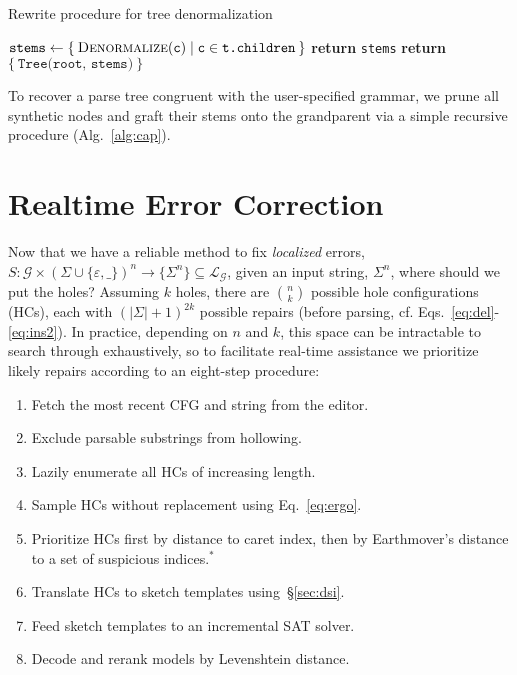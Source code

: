 \documentclass[sigplan,review,anonymous,acmsmall]{acmart}\settopmatter{printfolios=false,printccs=false,printacmref=false}
\begin{document}
    \begin{algorithm}
        \caption{Rewrite procedure for tree denormalization}\label{alg:cap}
        \begin{algorithmic}
                \State $\texttt{stems} \leftarrow \{\:\textsc{Denormalize}(\texttt{c}) \mid \texttt{c} \in \texttt{t.children}\:\}$
                    \State \textbf{return } \texttt{stems} 
                \Else{}
                \State \textbf{return } $\{\:\texttt{Tree(root, stems)}\:\}$
                \EndIf
            \EndProcedure
        \end{algorithmic}
    \end{algorithm}

    \noindent To recover a parse tree congruent with the user-specified grammar, we prune all synthetic nodes and graft their stems onto the grandparent via a simple recursive procedure (Alg.~\ref{alg:cap}).%

    \section{Realtime Error Correction}\label{sec:holes}

    Now that we have a reliable method to fix \textit{localized} errors, $S: \mathcal{G} \times (\Sigma\cup\{\varepsilon, \texttt{\_}\})^n \rightarrow \{\Sigma^n\}\subseteq \mathcal{L}_\mathcal{G}$, given an input string, $\Sigma^n$, where should we put the holes? Assuming $k$ holes, there are ${n \choose k}$ possible hole configurations (HCs), each with $(|\Sigma| + 1)^{2k}$ possible repairs (before parsing, cf. Eqs.~\ref{eq:del}-\ref{eq:ins2}). In practice, depending on $n$ and $k$, this space can be intractable to search through exhaustively, so to facilitate real-time assistance we prioritize likely repairs according to an eight-step procedure:

    \begin{enumerate}
        \item Fetch the most recent CFG and string from the editor.
        \item Exclude parsable substrings from hollowing.
        \item Lazily enumerate all HCs of increasing length.
        \item Sample HCs without replacement using Eq.~\ref{eq:ergo}.
        \item Prioritize HCs first by distance to caret index, then by Earthmover's distance to a set of suspicious indices.$^*$
        \item Translate HCs to sketch templates using~\S\ref{sec:dsi}.
        \item Feed sketch templates to an incremental SAT solver.
        \item Decode and rerank models by Levenshtein distance.
    \end{enumerate}
\end{document}

